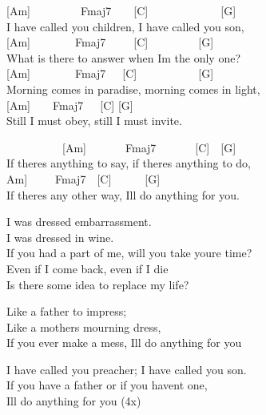 \documentclass[
  letterpaper,
]{scrbook}
\begin{document}
{[}Am{]}~~~~~~~~~Fmaj7~~~~{[}C{]}~~~~~~~~~~~~~{[}G{]}\\
I have called you children, I have called you son,\\
{[}Am{]}~~~~~~~~Fmaj7~~~~~{[}C{]}~~~~~~~~~{[}G{]}\\
What is there to answer when I\textquotesingle m the only one?\\
{[}Am{]}~~~~~~~~Fmaj7~~~{[}C{]}~~~~~~~~~~~{[}G{]}\\
Morning comes in paradise, morning comes in light,\\
{[}Am{]}~~~~Fmaj7~~~{[}C{]} {[}G{]}\\
Still I must obey, still I must invite.

~~~~~~~~~~{[}Am{]}~~~~~~~Fmaj7~~~~~~~{[}C{]}~~{[}G{]}\\
If there\textquotesingle s anything to say, if there\textquotesingle s
anything to do,\\
\hspace*{0.333em}\hspace*{0.333em}\hspace*{0.333em}\hspace*{0.333em}\hspace*{0.333em}\hspace*{0.333em}\hspace*{0.333em}\hspace*{0.333em}\hspace*{0.333em}\hspace*{0.333em}{[}Am{]}~~~~~Fmaj7~~{[}C{]}~~~~~~{[}G{]}\\
If there\textquotesingle s any other way, I\textquotesingle ll do
anything for you.

I was dressed embarrassment.\\
I was dressed in wine.\\
If you had a part of me, will you take you\textquotesingle re time?\\
Even if I come back, even if I die\\
Is there some idea to replace my life?

Like a father to impress;\\
Like a mother\textquotesingle s mourning dress,\\
If you ever make a mess, I\textquotesingle ll do anything for you

I have called you preacher; I have called you son.\\
If you have a father or if you haven\textquotesingle t one,\\
I\textquotesingle ll do anything for you (4x)
\end{document}
